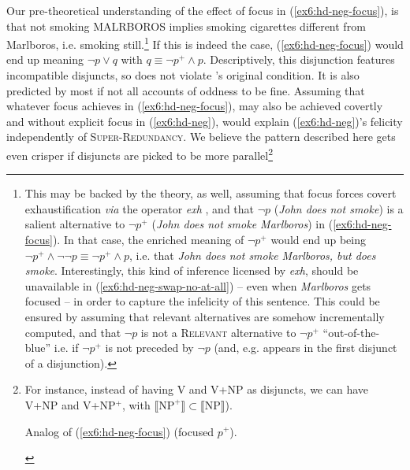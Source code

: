 Our pre-theoretical understanding of the effect of focus in (\ref{ex6:hd-neg-focus}), is that not smoking MALRBOROS implies smoking cigarettes different from Marlboros, i.e. smoking still.\footnote{\label{fn:exh-marlboros}This may be backed by the theory, as well, assuming that focus forces covert exhaustification \textit{via} the operator \textit{exh} \citep{Fox2007,Chierchia2009}, and that $\neg p$ (\textit{John does not smoke}) is a salient alternative to $\neg p^+$ (\textit{John does not smoke Marlboros}) in (\ref{ex6:hd-neg-focus}). In that case, the enriched meaning of $\neg p^+$ would end up being $\neg p^+ \wedge \neg\neg p \equiv \neg p^+ \wedge p$, i.e. that \textit{John does not smoke Marlboros, but does smoke}. Interestingly, this kind of inference licensed by \textit{exh}, should be unavailable in (\ref{ex6:hd-neg-swap-no-at-all}) -- even when \textit{Marlboros} gets focused -- in order to capture the infelicity of this sentence. This could be ensured by assuming that relevant alternatives are somehow incrementally computed, and that $\neg p$ is not a \textsc{Relevant} alternative to $\neg p^+$ ``out-of-the-blue'' i.e. if $\neg p^+$ is not preceded by $\neg p$ (and, e.g. appears in the first disjunct of a disjunction).} If this is indeed the case, (\ref{ex6:hd-neg-focus}) would end up meaning $\neg p \vee q$ with $q \equiv \neg p^+ \wedge p$. Descriptively, this disjunction features incompatible disjuncts, so does not violate \citeauthor{Hurford1974}'s original condition. It is also predicted by most if not all accounts of oddness to be fine. Assuming that whatever focus achieves in (\ref{ex6:hd-neg-focus}), may also be achieved covertly and without explicit focus in (\ref{ex6:hd-neg}), would explain (\ref{ex6:hd-neg})'s felicity independently of \textsc{Super-Redundancy}. We believe the pattern described here gets even crisper if disjuncts are picked to be more parallel\footnote{For instance, instead of having V and V+NP as disjuncts, we can have V+NP and V+NP$^+$, with $\llbracket \text{NP}^+\rrbracket \subset \llbracket \text{NP}\rrbracket$).
	\begin{exe}
		\begin{xlist}
			\label{ex6:hd-neg-original}
			\label{ex6:hd-neg-swapped}
			\label{ex6:hd-neg-swapped-at-all}
		\end{xlist}
		\ex Analog of (\ref{ex6:hd-neg-focus}) (focused $p^+$).
		\begin{xlist}
			\ex {John either doesn't own a dog or doesn't own a LAB.}
		\end{xlist}
\end{exe}}\\


